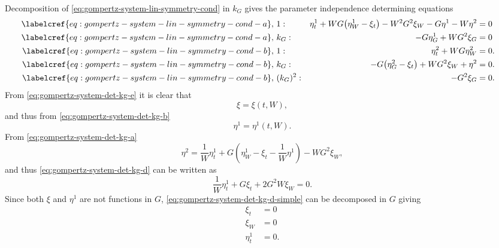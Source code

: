 Decomposition of \cref{eq:gompertz-system-lin-symmetry-cond} in \(k_G\) gives the parameter independence determining equations
\begin{subequations}
  \begin{flalign}
    \labelcref{eq:gompertz-system-lin-symmetry-cond-a},\ & 1 : & \eta^1_t + W G \left(\eta^1_W - \xi_t\right) - W^2 G^2 \xi_W - G \eta^1 - W \eta^2 &= 0 &\label{eq:gompertz-system-det-kg-a}\\
    \labelcref{eq:gompertz-system-lin-symmetry-cond-a},\ & k_G : & - G \eta^1_G + W G^2 \xi_G &= 0 &\label{eq:gompertz-system-det-kg-b}\\
    \labelcref{eq:gompertz-system-lin-symmetry-cond-b},\ & 1 : & \eta^2_t + W G \eta^2_W &= 0. &\label{eq:gompertz-system-det-kg-c} \\
    \labelcref{eq:gompertz-system-lin-symmetry-cond-b},\ & k_G : & - G \left(\eta^2_G - \xi_t\right) + W G^2 \xi_W + \eta^2 &= 0. &\label{eq:gompertz-system-det-kg-d} \\
    \labelcref{eq:gompertz-system-lin-symmetry-cond-b},\ & (k_G)^2 : & - G^2 \xi_G &= 0. &\label{eq:gompertz-system-det-kg-e}
  \end{flalign}
\end{subequations}
From \cref{eq:gompertz-system-det-kg-e} it is clear that
\begin{equation} \label{eq:system-gompertz-kG-first-simplification-1}
  \xi = \xi(t, W),
\end{equation}
and thus from \cref{eq:gompertz-system-det-kg-b}
\begin{equation} \label{eq:system-gompertz-kG-first-simplification-2}
  \eta^1 = \eta^1(t, W).
\end{equation}
From \cref{eq:gompertz-system-det-kg-a}
\begin{equation*}
  \eta^2 = \frac{1}{W}\eta^1_t + G \left(\eta^1_W - \xi_t - \frac{1}{W} \eta^1 \right) - W G^2 \xi_W,
\end{equation*}
and thus \cref{eq:gompertz-system-det-kg-d} can be written as
\begin{equation}\label{eq:gompertz-system-det-kg-d-simple}
  \frac{1}{W}\eta^1_t + G \xi_t + 2 G^2 W \xi_W = 0.
\end{equation}
Since both \(\xi\) and \(\eta^1\) are not functions in \(G\), \cref{eq:gompertz-system-det-kg-d-simple} can be decomposed in \(G\) giving
\begin{align*}
  \xi_t &= 0 \\
  \xi_W &= 0 \\
  \eta^1_t &= 0.
\end{align*}
